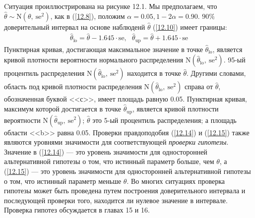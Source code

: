 \begin{figure}[h]
\end{figure}
Cитуация проиллюстрирована на рисунке 12.1. Мы предполагаем, что $\widehat{\theta} \sim \mathrm{N}(\theta, \ \text{se}^{2})$, как в (\ref{12.8}), положим 
$ \alpha = 0.05, 1-2\alpha = 0.90.$ $90\%$ доверительный интервал на основе наблюденй $\widehat{\theta}$ (\ref{12.10}) имеет границы:
\begin{gather}\label{12.16}
\widehat{\theta}_{\text{lo}} = \widehat{\theta} - 1.645 \cdot\text{se}, \ \ \ \widehat{\theta}_{\text{up}} = \widehat{\theta} + 1.645 \cdot \text{se}
\end{gather}
Пунктирная кривая, достигающая максимальное значение в точке $\widehat{\theta}_{\text{lo}}$, является кривой плотности вероятности нормального распределения $ \mathrm{N}(\widehat{\theta}_{\text{lo}}, \  \text{se}^{2})$. 95-ый процентиль распределения $ \mathrm{N}(\widehat{\theta}_{\text{lo}}, \ \text{se}^{2})$ находится в точке $\widehat{\theta}$. Другими словами, область под кривой плотности распределения $ \mathrm{N}(\widehat{\theta}_{\text{lo}}, \ \text{se}^{2})$  справа от $\widehat{\theta}$, обозначенная буквой <<с>>, имеет площадь равную 0.05. Пунктирная кривая, максимум которой достигается в точке $\widehat{\theta}_{\text{up}}$, является кривой плотности вероятности $\mathrm{N}(\widehat{\theta}_{\text{up}}, \ \text{se}^{2})$;  $\widehat{\theta}$ это 5-ый процентиль распределения; а площадь области <<b>> равна 0.05. Проверки правдоподобия (\ref{12.14}) и (\ref{12.15}) также являются уровнями значимости для соответствующей \textit{проверки гипотезы}. Значение в (\ref{12.14}) --- это уровень значимости для односторонней альтернативной гипотезы о том, что истинный параметр больше, чем  $\theta$, а (\ref{12.15}) --- это уровень значимости для односторонней альтернативной гипотезы о том, что истинный параметр меньше $\theta$. Во многих ситуациях проверка гипотезы может быть проведена путем построения доверительного интервала и последующей проверки того, находится ли нулевое значение в интервале. Проверка гипотез обсуждается в главах 15 и 16. 